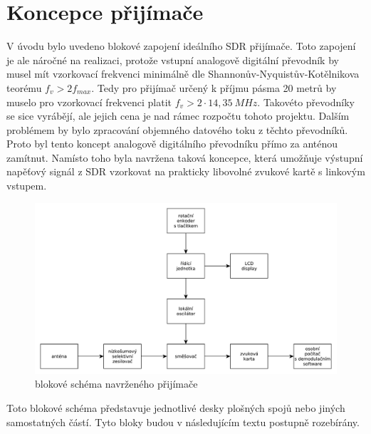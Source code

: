 \section{Koncepce přijímače}
\indent\indent V úvodu bylo uvedeno blokové zapojení ideálního SDR přijímače. Toto zapojení je ale náročné na realizaci, protože vstupní analogově digitální převodník  by musel mít vzorkovací frekvenci minimálně dle Shannonův-Nyquistův-Kotělnikova teorému $f_v > 2f_{max}$. Tedy pro přijímač určený k příjmu pásma 20 metrů by muselo pro vzorkovací frekvenci platit $f_v > 2 \cdot 14,35~MHz$. Takovéto převodníky se sice vyrábějí, ale jejich cena je nad rámec rozpočtu tohoto projektu. Dalším problémem by bylo zpracování objemného datového toku z těchto převodníků. Proto byl  tento koncept analogově digitálního převodníku přímo za anténou zamítnut. Namísto toho byla navržena taková koncepce, která umožňuje výstupní napěťový signál z SDR vzorkovat na prakticky libovolné zvukové kartě s linkovým vstupem.
\begin{figure}[H]
	\centering
	\label{obr:bs_sdr}
	\includegraphics[width=170mm]{img/bs_sdr.pdf}
	\caption{blokové schéma navrženého přijímače}    		
\end{figure}

Toto blokové schéma představuje jednotlivé desky plošných spojů nebo jiných samostatných částí. Tyto bloky budou v následujícím textu postupně rozebírány.





\clearpage